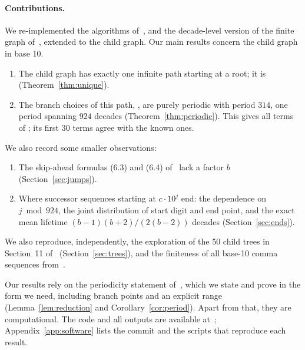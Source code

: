 \paragraph{Contributions.}
We re-implemented the algorithms of~\cite{comma}, and the decade-level version of the finite graph
of~\cite{dbts}, extended to the child graph. Our main results concern the child graph in base 10.
\begin{enumerate}[label=(\roman*)]
  \item The child graph has exactly one infinite path starting at a root; it is 
        (Theorem~\ref{thm:unique}).
  \item The branch choices of this path, , are purely periodic with period $314$,
        one period spanning $924$ decades (Theorem~\ref{thm:periodic}). This gives all terms of
        ; its first $30$ terms agree with the known ones.
\end{enumerate}
We also record some smaller observations:
\begin{enumerate}[label=(\roman*),resume]
  \item The skip-ahead formulas (6.3) and (6.4) of~\cite{comma} lack a factor $b$
        (Section~\ref{sec:jumps}).
  \item Where successor sequences starting at $c \cdot 10^j$ end: the dependence on $j \bmod 924$,
        the joint distribution of start digit and end point, and the exact mean lifetime
        $(b-1)(b+2) / (2(b-2))$ decades (Section~\ref{sec:ends}).
\end{enumerate}
We also reproduce, independently, the exploration of the 50 child trees in Section~11
of~\cite{comma} (Section~\ref{sec:trees}), and the finiteness of all base-10 comma sequences
from~\cite{dbts}.

Our results rely on the periodicity statement of~\cite[Proposition~8]{dbts}, which we state and
prove in the form we need, including branch points and an explicit range
(Lemma~\ref{lem:reduction} and Corollary~\ref{cor:period}). Apart from that, they are
computational. The code and all outputs are available at~\cite{repo}; Appendix~\ref{app:software}
lists the commit and the scripts that reproduce each result.
